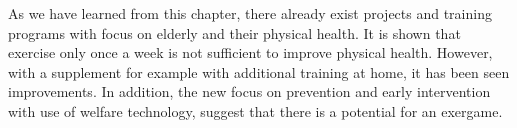 As we have learned from this chapter, there already exist projects and training programs with focus on elderly and their physical health. It is shown that exercise only once a week is not sufficient to improve physical health. However, with a supplement for example with additional training at home, it has been seen improvements. In addition, the new focus on prevention and early intervention with use of welfare technology, suggest that there is a potential for an exergame. 

